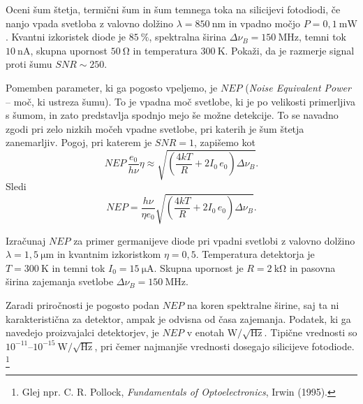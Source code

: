 \begin{naloga}
Oceni šum štetja, termični šum in šum temnega toka na silicijevi fotodiodi, če 
nanjo vpada svetloba z valovno dolžino $\lambda=850~\si{\nano\meter}$
in vpadno močjo $P=0,1~\si{\milli\watt}$. Kvantni izkoristek diode je $85~\%$,
spektralna širina $\Delta\nu_B=150~\si{\mega\hertz}$, temni tok $10~\si{\nano\ampere}$,
skupna upornost $50~\si{\ohm}$ in temperatura $300~\si{\kelvin}$. Pokaži, 
da je razmerje signal proti šumu $SNR\sim250$. 
\end{naloga}

Pomemben parameter, ki ga pogosto vpeljemo, je $NEP$ ({\it Noise Equivalent Power} -- 
moč, ki ustreza šumu). To je vpadna moč svetlobe, ki je po velikosti primerljiva 
s šumom, in zato predstavlja spodnjo mejo še možne detekcije. To se navadno zgodi 
pri zelo nizkih močeh vpadne svetlobe, pri katerih je šum štetja zanemarljiv.
Pogoj, pri katerem je $SNR=1$, zapišemo kot
\begin{equation}
NEP\, \frac{e_0}{h \nu} \eta \approx \sqrt{\left(\frac{4 kT}{R} + 2 I_0\,e_0 \right) \Delta\nu_B}.
\end{equation}
Sledi
\begin{equation}
NEP = \frac{h \nu}{\eta e_0}\sqrt{\left(\frac{4 kT}{R} + 2 I_0\,e_0 \right) \Delta\nu_B}.
\label{NEP}
\end{equation}
\begin{naloga}
Izračunaj $NEP$ za primer germanijeve diode pri vpadni svetlobi z valovno dolžino
$\lambda = 1,5~\si{\micro\meter}$ in kvantnim izkoristkom $\eta=0,5$. Temperatura detektorja
je $T=300~\si{\kelvin}$ in temni tok $I_0=15~\si{\micro\ampere}$. Skupna upornost
je $R=2~\si{\kilo\ohm}$ in pasovna širina zajemanja svetlobe
$\Delta\nu_B=150~\si{\mega\hertz}$.
\end{naloga}

\begin{remark}
Zaradi priročnosti je pogosto podan $NEP$ na koren spektralne širine, saj ta ni 
karakteristična za detektor, ampak je odvisna od časa zajemanja. Podatek, ki 
ga navedejo proizvajalci detektorjev, je $NEP$ v enotah 
$\si{\watt}/\sqrt{\si{\hertz}}$. Tipične vrednosti so 
$10^{-11}$--$10^{-15}~\si{\watt}/\sqrt{\si{\hertz}}$, pri čemer najmanjše vrednosti
dosegajo silicijeve fotodiode. \footnote{Glej npr. C. R. Pollock, {\it Fundamentals of Optoelectronics}, Irwin (1995).}
\end{remark}

